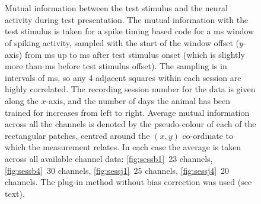 \begin{figure}[htbp]%
    \centering
    ~~
    \\
    ~~
    \caption{Mutual information between the test stimulus and the neural activity during test presentation.
The mutual information with the test stimulus is taken for a spike timing based code for a \unit[20]{ms} window of spiking activity, sampled with the start of the window offset ($y$-axis) from \unit[0]{ms} up to \unit[500]{ms} after test stimulus onset (which is slightly more than \unit[20]{ms} before test stimulus offset). The sampling is in intervals of \unit[5]{ms}, so any 4 adjacent squares within each session are highly correlated.
The recording session number for the data is given along the $x$-axis, and the number of days the animal has been trained for increases from left to right.
Average mutual information across all the channels is denoted by the pseudo-colour of each of the rectangular patches, centred around the $(x,y)$ co-ordinate to which the measurement relates.
In each case the average is taken across all available channel data: \ref{fig:sessb1}~23 channels, \ref{fig:sessb4}~30 channels, \ref{fig:sessj1}~25 channels, \ref{fig:sessj4}~20 channels.
The plug-in method without bias correction was used (see text).
}
    \label{fig:sess}
\end{figure}


